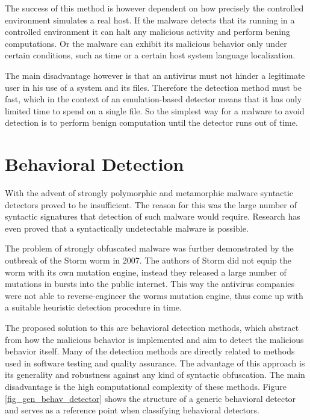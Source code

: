 The success of this method is however dependent on how precisely the controlled environment simulates a real host. If the malware detects that its running in a controlled environment it can halt any malicious activity and perform bening computations. Or the malware can exhibit its malicious behavior only under certain conditions, such as time or a certain host system language localization.

The main disadvantage however is that an antivirus must not hinder a legitimate user in his use of a system and its files. Therefore the detection method must be fast, which in the context of an emulation-based detector means that it has only limited time to spend on a single file. So the simplest way for a malware to avoid detection is to perform benign computation until the detector runs out of time.

\section{Behavioral Detection}
\label{s_behav_det}
With the advent of strongly polymorphic and metamorphic malware syntactic detectors proved to be insufficient. The reason for this was the large number of syntactic signatures that detection of such malware would require. Research has even proved that a syntactically undetectable malware is possible\cite{Filiol07}. 

The problem of strongly obfuscated malware was further demonstrated by the outbreak of the Storm worm in 2007. The authors of Storm did not equip the worm with its own mutation engine, instead they released a large number of mutations in bursts into the public internet. This way the antivirus companies were not able to reverse-engineer the worms mutation engine, thus come up with a suitable heuristic detection procedure in time.

The proposed solution to this are behavioral detection methods, which abstract from how the malicious behavior is implemented and aim to detect the malicious behavior itself. Many of the detection methods are directly related to methods used in software testing and quality assurance. The advantage of this approach is its generality and robustness against any kind of syntactic obfuscation. The main disadvantage is the high computational complexity of these methods. Figure \ref{fig_gen_behav_detector} shows the structure of a generic behavioral detector and serves as a reference point when classifying behavioral detectors.

